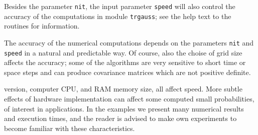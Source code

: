 Besides the parameter {\tt nit}, the input parameter {\tt speed} will
also control the accuracy of the computations in module {\tt trgauss};
see the help text to the routines for information.

\begin{remark}
The accuracy of the numerical computations depends on the parameters {\tt nit} and {\tt speed} in 
a natural and predictable way. Of course, also the choise of  grid size affects the 
accuracy; some of the algorithms are very sensitive to short time or space steps and can 
produce covariance matrices which are not positive definite. 

\ML{} version, computer CPU, and RAM memory size, all affect speed. More subtle effects of hardware implementation 
can affect some computed small probabilities, of interest in applications. In the examples we 
present many numerical results and execution times, and the reader is advised to make own experiments 
to become familiar with these characteristics.  
\end{remark}


